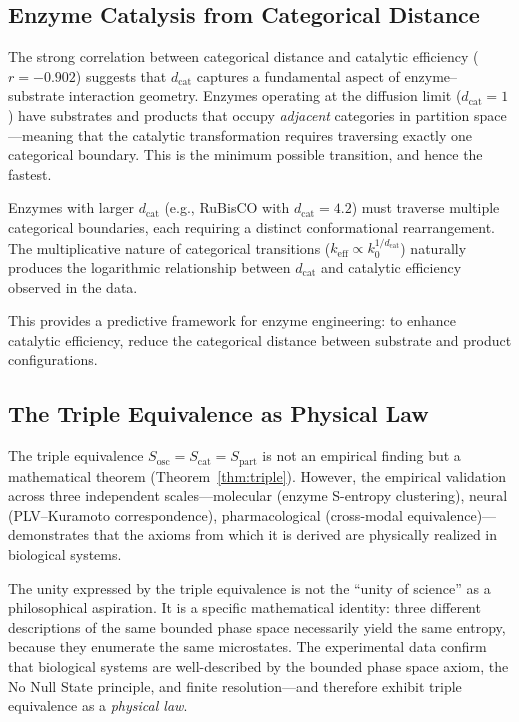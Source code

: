 \documentclass[twocolumn,10pt]{article}
\newcommand{\Sosc}{S_{\mathrm{osc}}}
\newcommand{\Scat}{S_{\mathrm{cat}}}
\newcommand{\Spart}{S_{\mathrm{part}}}
\newcommand{\dcat}{d_{\mathrm{cat}}}
\begin{document}
\subsection{Enzyme Catalysis from Categorical Distance}

The strong correlation between categorical distance and catalytic efficiency ($r = -0.902$) suggests that $\dcat$ captures a fundamental aspect of enzyme--substrate interaction geometry.  Enzymes operating at the diffusion limit ($\dcat = 1$) have substrates and products that occupy \emph{adjacent} categories in partition space---meaning that the catalytic transformation requires traversing exactly one categorical boundary.  This is the minimum possible transition, and hence the fastest.

Enzymes with larger $\dcat$ (e.g., RuBisCO with $\dcat = 4.2$) must traverse multiple categorical boundaries, each requiring a distinct conformational rearrangement.  The multiplicative nature of categorical transitions ($k_{\mathrm{eff}} \propto k_{0}^{1/\dcat}$) naturally produces the logarithmic relationship between $\dcat$ and catalytic efficiency observed in the data.

This provides a predictive framework for enzyme engineering: to enhance catalytic efficiency, reduce the categorical distance between substrate and product configurations.

\subsection{The Triple Equivalence as Physical Law}

The triple equivalence $\Sosc = \Scat = \Spart$ is not an empirical finding but a mathematical theorem (Theorem~\ref{thm:triple}).  However, the empirical validation across three independent scales---molecular (enzyme S-entropy clustering), neural (PLV--Kuramoto correspondence), pharmacological (cross-modal equivalence)---demonstrates that the axioms from which it is derived are physically realized in biological systems.

The unity expressed by the triple equivalence is not the ``unity of science'' as a philosophical aspiration.  It is a specific mathematical identity: three different descriptions of the same bounded phase space necessarily yield the same entropy, because they enumerate the same microstates.  The experimental data confirm that biological systems are well-described by the bounded phase space axiom, the No Null State principle, and finite resolution---and therefore exhibit triple equivalence as a \emph{physical law}.
\end{document}
